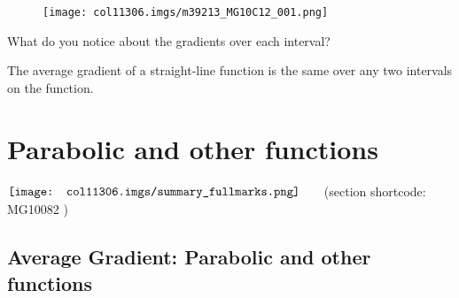     \par
    \setcounter{subfigure}{0}
	\begin{figure}[H] %
    \begin{center}
    \label{m39213*id190171!!!underscore!!!media}\label{m39213*id190171!!!underscore!!!printimage}\texttt{[image: col11306.imgs/m39213\_MG10C12\_001.png]} %
      \vspace{2pt}
    \vspace{.1in}
    \end{center}
 \end{figure}       
      \par 
      \label{m39213*id190178}What do you notice about the gradients over each interval?
 \par 
      \label{m39213*id190187}The average gradient of a straight-line function is the same over any two intervals on the function.\par 
    \label{m39213**end}
         \section{ Parabolic and other functions}
    \nopagebreak
            \label{m39223} $ \hspace{-5pt}\begin{array}{cccccccccccc}   \texttt{[image: col11306.imgs/summary\_fullmarks.png]} &   \end{array} $ \hspace{2 pt}\raisebox{-5 pt}{} {(section shortcode: MG10082 )} \par 
\label{m39223*cid4}
            \subsection{ Average Gradient: Parabolic and other functions}
            \nopagebreak
\label{m39223*secfhsst!!!underscore!!!id252}

